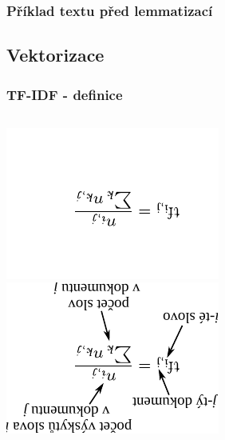 \documentclass{beamer}
\begin{document}
\begin{frame}
\frametitle{Příklad textu před lemmatizací}
  \begin{overprint}
    \resizebox{.51\textwidth}{!}{}
    \resizebox{\textwidth}{!}{}
  \end{overprint}
\end{frame}


\subsection{Vektorizace}

\begin{frame}
\frametitle{TF-IDF - definice}

\begin{columns}
    \begin{overprint}
      \centering\includegraphics[width=.6\textwidth,height=\textheight,angle=180,keepaspectratio]{figures/tf.pdf}
      \centering\includegraphics[width=.6\textwidth,height=\textheight,angle=180,keepaspectratio]{figures/tf_described.pdf}
    \end{overprint}


\end{columns}
\end{frame}
\end{document}
